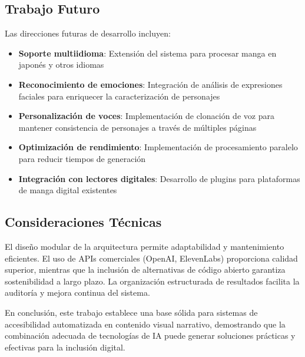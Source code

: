 \documentclass[conference]{IEEEtran}
\begin{document}
\subsection{Trabajo Futuro}
Las direcciones futuras de desarrollo incluyen:
\begin{itemize}
\item \textbf{Soporte multiidioma}: Extensión del sistema para procesar manga en japonés y otros idiomas
\item \textbf{Reconocimiento de emociones}: Integración de análisis de expresiones faciales para enriquecer la caracterización de personajes
\item \textbf{Personalización de voces}: Implementación de clonación de voz para mantener consistencia de personajes a través de múltiples páginas
\item \textbf{Optimización de rendimiento}: Implementación de procesamiento paralelo para reducir tiempos de generación
\item \textbf{Integración con lectores digitales}: Desarrollo de plugins para plataformas de manga digital existentes
\end{itemize}

\subsection{Consideraciones Técnicas}
El diseño modular de la arquitectura permite adaptabilidad y mantenimiento eficientes. El uso de APIs comerciales (OpenAI, ElevenLabs) proporciona calidad superior, mientras que la inclusión de alternativas de código abierto garantiza sostenibilidad a largo plazo. La organización estructurada de resultados facilita la auditoría y mejora continua del sistema.

En conclusión, este trabajo establece una base sólida para sistemas de accesibilidad automatizada en contenido visual narrativo, demostrando que la combinación adecuada de tecnologías de IA puede generar soluciones prácticas y efectivas para la inclusión digital.



\end{document}
